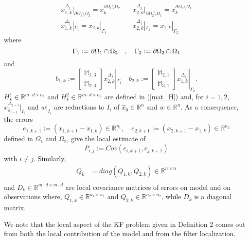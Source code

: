 \documentclass[smallcondensed]{svjour3}
\begin{document}
\begin{definition}
\begin{equation}
\begin{array}{ll}
x_{1,k}^{\Delta_{j}}|_{\partial \Omega_{1} \setminus \Omega_{2}}={x}_{k}^{\partial \Omega_{1} \setminus \Omega_{2}}\\
x_{1,k}^{\Delta_{j}}|_{\Gamma_{1}} = x_{2,k}|_{\Gamma_{1}}
  \end{array}\quad 
  \begin{array}{ll}
x_{2,k}^{\Delta_{j}}|_{\partial \Omega_{2} \setminus  \Omega_{1}}={x}_{k}^{\partial \Omega_{2} \setminus \Omega_{1}}\\
x_{2,k}^{\Delta_{j}}|_{\Gamma_{2}}  = x_{1,k}|_{\Gamma_{2}} 
  \end{array}
\end{equation}
where
\begin{equation}
    \Gamma_{1}:=\partial \Omega_{1}\cap \Omega_{2} \quad, \quad \Gamma_{2}:=\partial \Omega_{2}\cap \Omega_{1}\\
\end{equation}
and 
\begin{equation}
    b_{1,k}:=\left[\begin{array}{ll} \mathbb{M}_{1,3}\\ \mathbb{M}_{2,3}\end{array}\right]x_{2,k}^{\Delta_{j}}|_{\Gamma_{1}} \quad b_{2,k}:=\left[\begin{array}{ll} \mathbb{M}_{2,1}\\ \mathbb{M}_{3,1}\end{array}\right]x_{1,k}^{\Delta_{j}}|_{\Gamma_{2}}.
\end{equation}
$H_{k}^{1}\in \mathbb{R}^{m\cdot d \times n_{1}}$ and $H_{k}^{2}\in \mathbb{R}^{m \cdot d \times n_{2}}$ are defined in (\ref{mat_H}) and,  for $i=1,2$, $x_{\bar{s}_{j-1}}^{\Delta_{j-1}}|_{I_{i}}$ and $w|_{I_{i}}$ are  reductions to  $I_{i}$ of  $\widehat{x}_{0}\in \mathbb{R}^{n}$ and $w\in \mathbb{R}^{n}$.
\noindent As a consequence,  the errors $$e_{1,k+1}:=(x_{1,k+1}-x_{1,k})\in\mathbb{R}^{n_{1}}, \quad  e_{2,k+1}:=(x_{2,k+1}-x_{1,k})\in\mathbb{R}^{n_{2}}$$ defined  in $\Omega_{1}$ and $\Omega_{2}$,  give the local estimate of  $$P_{i,j}:=Cov(e_{i,k+1},e_{j,k+1})$$ with  $i\neq j$.
Similarly, 
\begin{equation}
\begin{array}{ll}
Q_{k}&=diag(Q_{1,k},Q_{2,k})\in \mathbb{R}^{n\times n}\\ 
\end{array}
\end{equation}
and $D_{k}\in \mathbb{R}^{m\cdot d\times m\cdot d}$ are local covariance  matrices of  errors on model and on  observations where,  $Q_{1,k}\in \mathbb{R}^{n_{1}\times n_{1}}$ and $Q_{2,k}\in \mathbb{R}^{n_{2}\times n_{2}}$, while $D_{k}$ is a diagonal matrix.

\end{definition}
\noindent We note that the local aspect of the KF problem given in Definition 2 comes out from both the local contribution of the model and from the filter localization.  
\end{document}
